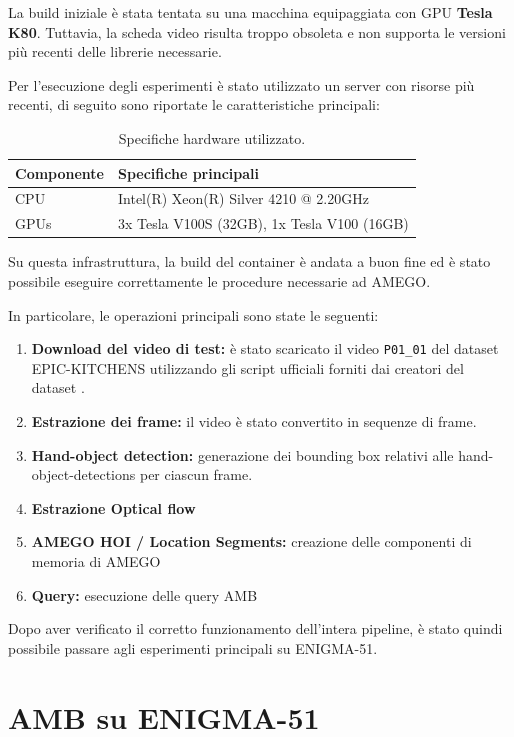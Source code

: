 La build iniziale è stata tentata su una macchina equipaggiata con GPU \textbf{Tesla K80}. Tuttavia, la scheda video risulta troppo obsoleta e non supporta le versioni più recenti delle librerie necessarie.

Per l'esecuzione degli esperimenti è stato utilizzato un server con risorse più recenti, di seguito sono riportate le caratteristiche principali:

\begin{table}[H]
    \centering
    \begin{tabular}{ll}
        \hline
        \textbf{Componente} & \textbf{Specifiche principali} \\
        \hline
        CPU & Intel(R) Xeon(R) Silver 4210 @ 2.20GHz \\
        GPUs & 3x Tesla V100S (32GB), 1x Tesla V100 (16GB) \\
        \hline
    \end{tabular}
    \caption{Specifiche hardware utilizzato.}
\end{table}


Su questa infrastruttura, la build del container è andata a buon fine ed è stato possibile eseguire correttamente le procedure necessarie ad AMEGO.  

In particolare, le operazioni principali sono state le seguenti:
\begin{enumerate}
    \item \textbf{Download del video di test:} è stato scaricato il video \texttt{P01\_01} del dataset EPIC-KITCHENS \cite{Damen2021PAMI} utilizzando gli script ufficiali forniti dai creatori del dataset \cite{epic_download_scripts}.
    \item \textbf{Estrazione dei frame:} il video è stato convertito in sequenze di frame.
    \item \textbf{Hand-object detection:} generazione dei bounding box relativi alle hand-object-detections per ciascun frame.
    \item \textbf{Estrazione Optical flow}
    \item \textbf{AMEGO HOI / Location Segments:} creazione delle componenti di memoria di AMEGO
    \item \textbf{Query:} esecuzione delle query AMB
\end{enumerate}

Dopo aver verificato il corretto funzionamento dell'intera pipeline, è stato quindi possibile passare agli esperimenti principali su ENIGMA-51.

\section{AMB su ENIGMA-51}

